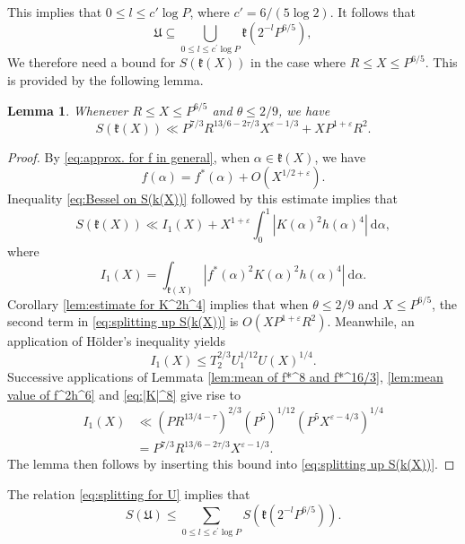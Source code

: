 \documentclass[12pt,english,reqno]{amsart}
\theoremstyle{definition}
\theoremstyle{remark}
\numberwithin{equation}{section}
\numberwithin{equation}{section}
\numberwithin{figure}{section}
\theoremstyle{plain}
\theoremstyle{plain}
\theoremstyle{plain}
\newtheorem{lem}[thm]{Lemma}
\theoremstyle{plain}
\numberwithin{equation}{section}
\numberwithin{thm}{section}
\begin{document}
This implies that $0\leq l\leq c'\log P$, where $c'=6/(5\log2)$.
It follows that
\begin{equation}
\mathfrak{U}\subseteq\bigcup_{0\leq l\leq c^{'}\log P}\mathfrak{k}(2^{-l}P^{6/5}),\label{eq:splitting for U}\end{equation}
We therefore need a bound for $S(\mathfrak{k}(X))$ in the case where $R\leq X\leq P^{6/5}$. This is provided by the following lemma.
\begin{lem}
\label{lem:estimate for S(k(X)) (extended)}Whenever $R\leq X\leq P^{6/5}$
and $\theta\leq2/9$, we have
\[
S(\mathfrak{k}(X))\ll P^{7/3}R^{13/6-2\tau/3}X^{\varepsilon-1/3}+XP^{1+\varepsilon}R^2.\]\end{lem}
\begin{proof}
By \eqref{eq:approx. for f in general}, when $\alpha\in\mathfrak{k}(X)$,
we have
\begin{equation}
f(\alpha)=f^{*}(\alpha)+O(X^{1/2+\varepsilon}).\label{eq:approx for f on k(X)}\end{equation}
Inequality \eqref{eq:Bessel on S(k(X))} followed by this estimate implies that
\begin{equation}
S(\mathfrak{k}(X))\ll I_{1}(X)+X^{1+\varepsilon}\int_{0}^{1}|K(\alpha)^{2}h(\alpha)^{4}|\:\mathrm{d}\alpha,\label{eq:splitting up S(k(X))}\end{equation}
where
\begin{equation}
I_{1}(X)=\int_{\mathfrak{k}(X)}|f^{*}(\alpha)^{2}K(\alpha)^{2}h(\alpha)^{4}|\:\mathrm{d}\alpha.\label{eq:I_1}\end{equation}
Corollary \ref{lem:estimate for K^2h^4} implies that when $\theta\leq2/9$
and $X\leq P^{6/5}$, the second term in \eqref{eq:splitting up S(k(X))}
is $O(XP^{1+\varepsilon}R^{2})$. Meanwhile, an application of H\"{o}lder's inequality yields
\[
I_{1}(X)\leq T_{2}^{2/3}U_1^{1/12}U(X)^{1/4}.\]
Successive applications of Lemmata \ref{lem:mean of f*^8 and f*^16/3},
\ref{lem:mean value of f^2h^6} and \eqref{eq:|K|^8} give
rise to
\begin{align*}
I_{1}(X) & \ll(PR^{13/4-\tau})^{2/3}(P^{5})^{1/12}(P^{5}X^{\varepsilon-4/3})^{1/4}\\
 & =P^{7/3}R^{13/6-2\tau/3}X^{\varepsilon-1/3}.\end{align*}
The lemma then follows by inserting this bound into \eqref{eq:splitting up S(k(X))}.\end{proof}
\par The relation \eqref{eq:splitting for U} implies that
\[
S(\mathfrak{U})\leq\sum_{0\leq l\leq c^{'}\log P}S(\mathfrak{k}(2^{-l}P^{6/5})).\]
\end{document}
